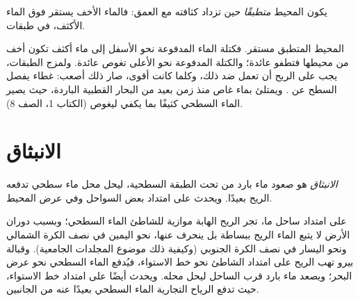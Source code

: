\begin{definition}[التطبق]\label{def:g10:layered-ocean:stratification}
يكون المحيط \emph{متطبقًا} حين تزداد كثافته مع العمق: فالماء الأخف
يستقر فوق الماء الأكثف، في طبقات.
\end{definition}

المحيط المتطبق مستقر. فكتلة الماء المدفوعة نحو الأسفل إلى ماء أكثف تكون أخف من
محيطها فتطفو عائدة؛ والكتلة المدفوعة نحو الأعلى تغوص عائدة. ولمزج الطبقات، يجب على
الريح أن تعمل ضد ذلك، وكلما كانت  أقوى، صار ذلك أصعب:  غطاء يفصل السطح عن . ويمتلئ  بماء غاص منذ
زمن بعيد من البحار القطبية الباردة، حيث يصير الماء السطحي كثيفًا بما يكفي ليغوص
(الكتاب 1، الصف 8).

\section{الانبثاق}

\begin{definition}[الانبثاق]\label{def:g10:layered-ocean:upwelling}
\emph{الانبثاق} هو صعود ماء بارد من تحت الطبقة السطحية، ليحل محل
ماء سطحي تدفعه الريح بعيدًا. ويحدث على امتداد بعض السواحل وفي عرض
المحيط.
\end{definition}

على امتداد ساحل ما، تجر الريح الهابة موازية للشاطئ الماء السطحي؛ وبسبب دوران
الأرض لا يتبع الماء الريح ببساطة بل ينحرف عنها، نحو اليمين في نصف الكرة الشمالي
ونحو اليسار في نصف الكرة الجنوبي (وكيفية ذلك موضوع المجلدات الجامعية). وقبالة
بيرو تهب الريح على امتداد الشاطئ نحو خط الاستواء، فيُدفع الماء السطحي نحو عرض
البحر؛ ويصعد ماء بارد قرب الساحل ليحل محله. ويحدث  أيضًا على امتداد خط
الاستواء، حيث تدفع الرياح التجارية الماء السطحي بعيدًا عنه من الجانبين.

